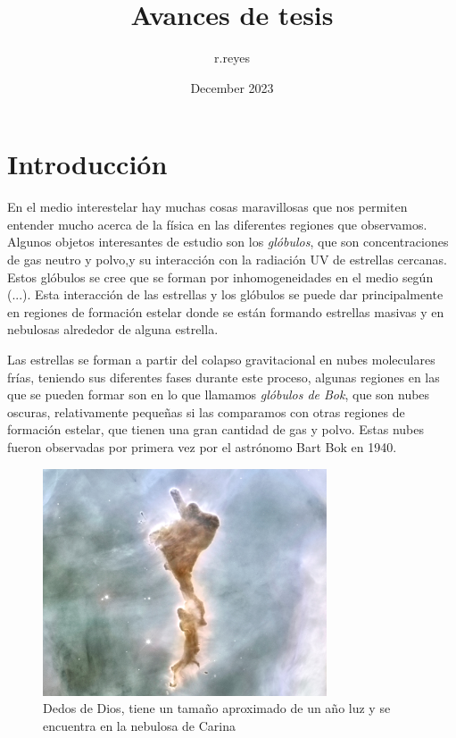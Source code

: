 \documentclass{book}
\title{Avances de tesis}
\author{r.reyes }
\date{December 2023}
\begin{document}
\maketitle

\tableofcontents

\newpage

\chapter{Introducción}

En el medio interestelar hay muchas cosas maravillosas que nos permiten entender mucho acerca de la física en las diferentes regiones que observamos. Algunos objetos interesantes de estudio son los \textit{glóbulos}, que son concentraciones de gas neutro y polvo,y su interacción con la radiación UV de estrellas cercanas. Estos glóbulos se cree que se forman por inhomogeneidades en el medio según (...). Esta interacción de las estrellas y los glóbulos se puede dar principalmente en regiones de formación estelar donde se están formando estrellas masivas y en nebulosas alrededor de alguna estrella.

Las estrellas se forman a partir del colapso gravitacional en nubes moleculares frías, teniendo sus diferentes fases durante este proceso, algunas regiones en las que se pueden formar son en lo que llamamos \textit{glóbulos de Bok}, que son nubes oscuras, relativamente pequeñas si las comparamos con otras regiones de formación estelar, que tienen una gran cantidad de gas y polvo. Estas nubes fueron observadas por primera vez por el astrónomo Bart Bok en 1940. 

\begin{figure}[h]
    \centering
    \includegraphics[width=0.75\textwidth]{Chp1_finger.jpg}
    \caption{Dedos de Dios, tiene un tamaño aproximado de un año luz y se encuentra en la nebulosa de Carina}
    \label{fig:zones}
\end{figure}
\end{document}
